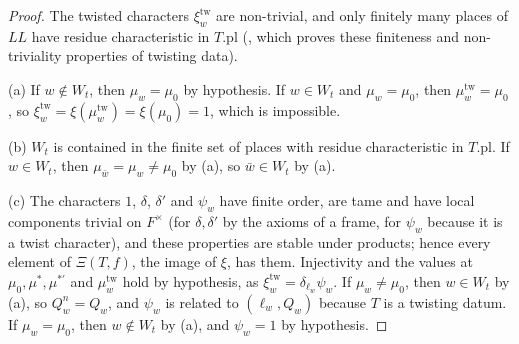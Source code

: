\begin{proof}
The twisted characters $\xi^{\mathrm{tw}}_w$ are non-trivial, and only finitely many places of $\mathit{LL}$ have residue characteristic in
$T.\mathrm{pl}$ (, which proves these finiteness and non-triviality properties of twisting data).

(a) If $w\notin W_t$, then $\mu_w=\mu_0$ by hypothesis. If $w\in W_t$ and $\mu_w=\mu_0$, then $\mu^{\mathrm{tw}}_w=\mu_0$, so
$\xi^{\mathrm{tw}}_w=\xi(\mu^{\mathrm{tw}}_w)=\xi(\mu_0)=1$, which is impossible.

(b) $W_t$ is contained in the finite set of places with residue characteristic in $T.\mathrm{pl}$. If $w\in W_t$, then
$\mu_{\bar w}=\mu_w\neq\mu_0$ by (a), so $\bar w\in W_t$ by (a).

(c) The characters $1$, $\delta$, $\delta'$ and $\psi_w$ have finite order, are tame and have local components trivial on $F^\times$ (for
$\delta,\delta'$ by the axioms of a frame, for $\psi_w$ because it is a twist character), and these properties are stable under
products; hence every element of $\Xi(T,f)$, the image of $\xi$, has them. Injectivity and the values at $\mu_0,\mu^*,\mu^{*\prime}$ and
$\mu^{\mathrm{tw}}_w$ hold by hypothesis, as $\xi^{\mathrm{tw}}_w=\delta_{\ell_w}\psi_w$. If $\mu_w\neq\mu_0$, then $w\in W_t$ by (a), so
$Q^n_w=Q_w$, and $\psi_w$ is related to $(\ell_w,Q_w)$ because $T$ is a twisting datum. If $\mu_w=\mu_0$, then $w\notin W_t$ by (a), and
$\psi_w=1$ by hypothesis.
\end{proof}

